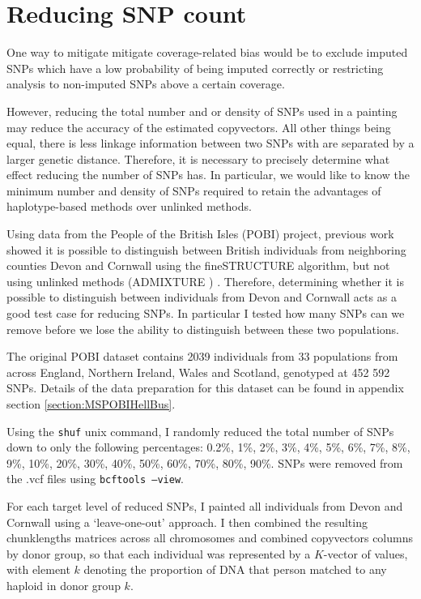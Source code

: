 \section{Reducing SNP count}

One way to mitigate mitigate coverage-related bias would be to exclude imputed SNPs which have a low probability of being imputed correctly or restricting analysis to non-imputed SNPs above a certain coverage.

However, reducing the total number and or density of SNPs used in a painting may reduce the accuracy of the estimated copyvectors. All other things being equal, there is less linkage information between two SNPs with are separated by a larger genetic distance. Therefore, it is necessary to precisely determine what effect reducing the number of SNPs has. In particular, we would like to know the minimum number and density of SNPs required to retain the advantages of haplotype-based methods over unlinked methods. 

Using data from the People of the British Isles (POBI) project, previous work showed it is possible to distinguish between British individuals from neighboring counties Devon and Cornwall using the fineSTRUCTURE algorithm, but not using unlinked methods (ADMIXTURE \cite{alexander2009fast}) \cite{Leslie2015}. Therefore, determining whether it is possible to distinguish between individuals from Devon and Cornwall acts as a good test case for reducing SNPs. In particular I tested how many SNPs can we remove before we lose the ability to distinguish between these two populations.


The original POBI dataset contains 2039 individuals from 33 populations from across England, Northern Ireland, Wales and Scotland, genotyped at 452 592 SNPs. Details of the data preparation for this dataset can be found in appendix section \ref{section:MSPOBIHellBus}.

Using the \texttt{shuf} unix command, I randomly reduced the total number of SNPs down to only the following percentages: 0.2\%, 1\%, 2\%, 3\%, 4\%, 5\%, 6\%, 7\%, 8\%, 9\%, 10\%, 20\%, 30\%, 40\%, 50\%, 60\%, 70\%, 80\%, 90\%. SNPs were removed from the .vcf files using \texttt{bcftools --view}.

For each target level of reduced SNPs, I painted all individuals from Devon and Cornwall using a `leave-one-out' approach. I then combined the resulting chunklengths matrices across all chromosomes and combined copyvectors columns by donor group, so that each individual was represented by a $K$-vector of values, with element $k$ denoting the proportion of DNA that person matched to any haploid in donor group $k$.

